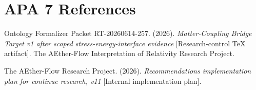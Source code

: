 \documentclass[11pt]{article}
\begin{document}
\section{APA 7 References}

Ontology Formalizer Packet RT-20260614-257. (2026). \emph{Matter-Coupling
Bridge Target v1 after scoped stress-energy-interface evidence}
[Research-control TeX artifact]. The AEther-Flow Interpretation of
Relativity Research Project.

The AEther-Flow Research Project. (2026). \emph{Recommendations
implementation plan for continue research, v11} [Internal implementation
plan].
\end{document}
